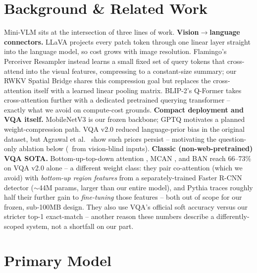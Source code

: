 \documentclass[final]{article}
\begin{document}
\section*{Background \& Related Work}

Mini-VLM sits at the intersection of three lines of work. \textbf{Vision$\to$language
connectors.} LLaVA \cite{liu2023visual} projects every patch token through one linear layer
straight into the language model, so cost grows with image resolution. Flamingo's Perceiver
Resampler \cite{alayrac2022flamingo} instead learns a small fixed set of query tokens that
cross-attend into the visual features, compressing to a constant-size summary; our RWKV Spatial
Bridge shares this compression goal but replaces the cross-attention itself with a learned linear
pooling matrix. BLIP-2's Q-Former \cite{li2023blip2} takes cross-attention further with a
dedicated pretrained querying transformer -- exactly what we avoid on compute-cost grounds.
\textbf{Compact deployment and VQA itself.} MobileNetV3 \cite{howard2019searching} is our frozen
backbone; GPTQ \cite{frantar2023gptq} motivates a planned weight-compression path. VQA v2.0
\cite{goyal2017making} reduced language-prior bias in the original dataset, but Agrawal et al.\
\cite{agrawal2018dontjust} show such priors persist -- motivating the question-only ablation below
(\blindFloor\ from vision-blind inputs). \textbf{Classic (non-web-pretrained) VQA SOTA.}
Bottom-up-top-down attention \cite{anderson2018bottomup}, MCAN \cite{yu2019deep}, and BAN
\cite{kim2018bilinear} reach 66--73\% on VQA v2.0 alone -- a different weight class: they pair
co-attention (which we avoid) with \emph{bottom-up region features} from a separately-trained
Faster R-CNN detector ($\sim$44M params, larger than our entire model), and Pythia
\cite{jiang2018pythia} traces roughly half their further gain to \emph{fine-tuning} those
features -- both out of scope for our frozen, sub-100MB design. They also use VQA's official soft
accuracy versus our stricter top-1 exact-match -- another reason these numbers describe a
differently-scoped system, not a shortfall on our part.

\section*{Primary Model}
\end{document}
